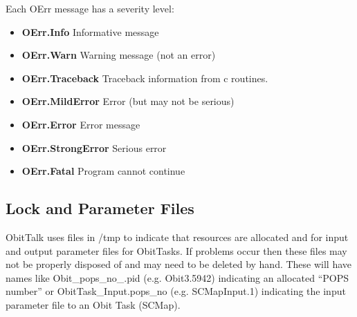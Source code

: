 \documentclass[11pt]{report}
\begin{document}
Each OErr message has a severity level:
\begin{itemize}
\item {\bf OErr.Info} Informative message
\item {\bf OErr.Warn} Warning message (not an error)
\item {\bf OErr.Traceback} Traceback information from c routines.
\item {\bf OErr.MildError} Error (but may not be serious)
\item {\bf OErr.Error} Error message
\item {\bf OErr.StrongError} Serious error
\item {\bf OErr.Fatal} Program cannot continue
\end{itemize}

\subsection{Lock and Parameter Files}
ObitTalk uses files in /tmp to indicate that resources are allocated
and for input and output parameter files for ObitTasks.
If problems occur then these files may not be properly disposed of and
may need to be deleted by hand.
These will have names like Obit\_pops\_no\_.pid (e.g. Obit3.5942)
indicating an allocated ``POPS number'' or ObitTask\_Input.pops\_no
(e.g. SCMapInput.1) indicating the input parameter file to an Obit
Task (SCMap).
\end{document}
